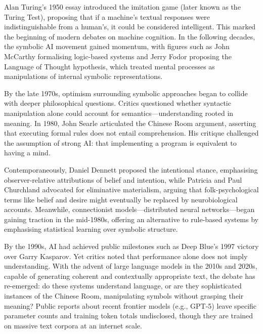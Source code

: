 \begin{historical}
Alan Turing’s 1950 essay introduced the \QSOpen{}imitation game\QSClose{} (later known as the Turing Test), proposing that if a machine’s textual responses were indistinguishable from a human’s, it could be considered intelligent. This marked the beginning of modern debates on machine cognition. In the following decades, the symbolic AI movement gained momentum, with figures such as John McCarthy formalising logic-based systems and Jerry Fodor proposing the \QSOpen{}Language of Thought\QSClose{} hypothesis, which treated mental processes as manipulations of internal symbolic representations.

By the late 1970s, optimism surrounding symbolic approaches began to collide with deeper philosophical questions. Critics questioned whether syntactic manipulation alone could account for semantics—understanding rooted in meaning. In 1980, John Searle articulated the Chinese Room argument, asserting that executing formal rules does not entail comprehension. His critique challenged the assumption of strong AI: that implementing a program is equivalent to having a mind.

Contemporaneously, Daniel Dennett proposed the \QSOpen{}intentional stance,\QSClose{} emphasising observer-relative attributions of belief and intention, while Patricia and Paul Churchland advocated for eliminative materialism, arguing that folk-psychological terms like \QSOpen{}belief\QSClose{} and \QSOpen{}desire\QSClose{} might eventually be replaced by neurobiological accounts. Meanwhile, connectionist models—distributed neural networks—began gaining traction in the mid-1980s, offering an alternative to rule-based systems by emphasising statistical learning over symbolic structure.

By the 1990s, AI had achieved public milestones such as Deep Blue’s 1997 victory over Garry Kasparov. Yet critics noted that performance alone does not imply understanding. With the advent of large language models in the 2010s and 2020s, capable of generating coherent and contextually appropriate text, the debate has re-emerged: do these systems understand language, or are they sophisticated instances of the Chinese Room, manipulating symbols without grasping their meaning? Public reports about recent frontier models (e.g., GPT-5) leave specific parameter counts and training token totals undisclosed, though they are trained on massive text corpora at an internet scale.
\end{historical}
